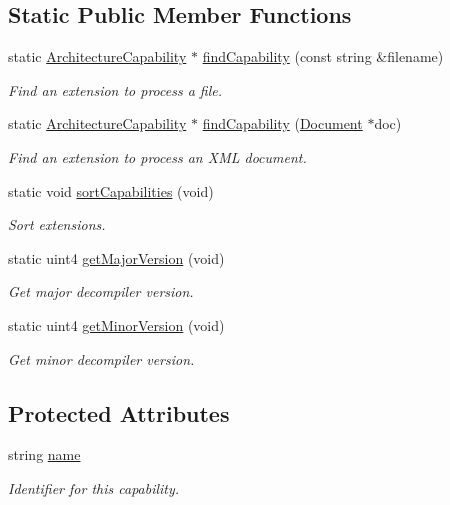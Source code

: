 \subsection*{Static Public Member Functions}
\begin{DoxyCompactItemize}
\item 
static \mbox{\hyperlink{class_architecture_capability}{Architecture\+Capability}} $\ast$ \mbox{\hyperlink{class_architecture_capability_a0150ffd9a1532fc394f75f67662b7cae}{find\+Capability}} (const string \&filename)
\begin{DoxyCompactList}\small\item\em Find an extension to process a file. \end{DoxyCompactList}\item 
static \mbox{\hyperlink{class_architecture_capability}{Architecture\+Capability}} $\ast$ \mbox{\hyperlink{class_architecture_capability_ac85f63c6e2e12e2f37f239cd5399ad42}{find\+Capability}} (\mbox{\hyperlink{class_document}{Document}} $\ast$doc)
\begin{DoxyCompactList}\small\item\em Find an extension to process an X\+ML document. \end{DoxyCompactList}\item 
static void \mbox{\hyperlink{class_architecture_capability_aa2c4dc37eac39cfe01d8ee5ec75d0c61}{sort\+Capabilities}} (void)
\begin{DoxyCompactList}\small\item\em Sort extensions. \end{DoxyCompactList}\item 
static uint4 \mbox{\hyperlink{class_architecture_capability_acac89caf4ab91f7ff041d6b24e7b3ffc}{get\+Major\+Version}} (void)
\begin{DoxyCompactList}\small\item\em Get {\itshape major} decompiler version. \end{DoxyCompactList}\item 
static uint4 \mbox{\hyperlink{class_architecture_capability_a4faeb6f1d9405d04c76e5b70f76d0cb4}{get\+Minor\+Version}} (void)
\begin{DoxyCompactList}\small\item\em Get {\itshape minor} decompiler version. \end{DoxyCompactList}\end{DoxyCompactItemize}
\subsection*{Protected Attributes}
\begin{DoxyCompactItemize}
\item 
string \mbox{\hyperlink{class_architecture_capability_a685df0ea6f90347afa6eb27d0b3fd3cc}{name}}
\begin{DoxyCompactList}\small\item\em Identifier for this capability. \end{DoxyCompactList}\end{DoxyCompactItemize}
